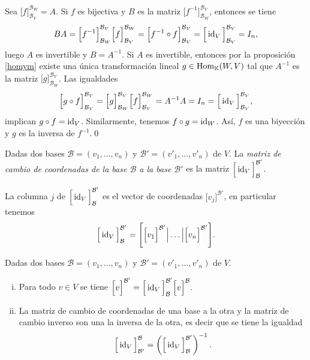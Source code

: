 Sea $\Big[ f \Big]^{\mathcal{B}_W}_{\mathcal{B}_V}=A$. Si $f$ es bijectiva y $B$ es la matriz $\Big[ f^{-1} \Big]_{\mathcal{B}_W}^{\mathcal{B}_V}$, entonces se tiene
$$BA=\Big[ f^{-1} \Big]_{\mathcal{B}_W}^{\mathcal{B}_V}\Big[ f \Big]^{\mathcal{B}_W}_{\mathcal{B}_V}= \Big[ f^{-1}\circ f \Big]^{\mathcal{B}_V}_{\mathcal{B}_V}=\Big[\operatorname{id}_V\Big]^{\mathcal{B}_V}_{\mathcal{B}_V}=I_n,$$
luego $A$ es invertible y $B=A^{-1}$. Si $A$ es invertible, entonces por la proposici\'on \ref{homym} existe una \'unica transformaci\'on lineal $g\in \operatorname{Hom}_{\mathbb{K}}(W,V)$ tal que $A^{-1}$ es la matriz $\Big[ g \Big]^{\mathcal{B}_V}_{\mathcal{B}_W}$. Las igualdades
$$\Big[ g\circ f \Big]^{\mathcal{B}_V}_{\mathcal{B}_V}=\Big[ g \Big]^{\mathcal{B}_V}_{\mathcal{B}_W}\Big[ f \Big]^{\mathcal{B}_W}_{\mathcal{B}_V}=A^{-1}A=I_n=\Big[ \operatorname{id}_V \Big]^{\mathcal{B}_V}_{\mathcal{B}_V},$$
implican $g\circ f=\operatorname{id}_V$. Similarmente, tenemos $f\circ g=\operatorname{id}_W$. As\'i, $f$ es una biyecci\'on y $g$ es la inversa de $f^{-1}$.\qed

\begin{defn}
Dadas dos bases $\mathcal{B}=(v_1,\ldots,v_n)$ y $\mathcal{B}'=(v'_1,\ldots,v'_n)$ de $V$. La \emph{matriz de cambio de coordenadas de la base $\mathcal{B}$ a la base $\mathcal{B}'$} es la matriz $\Big[\operatorname{id}_V\Big]^{\mathcal{B}'}_\mathcal{B}$.
\end{defn}

\begin{obs}
La columna $j$ de $\Big[\operatorname{id}_V\Big]^{\mathcal{B}'}_{\mathcal{B}}$ es el vector de coordenadas $\Big[ v_j\Big]^{\mathcal{B}'}$, en particular tenemos
$$\Big[\operatorname{id}_V\Big]^{\mathcal{B}'}_{\mathcal{B}}=\Bigg[\Big[ v_1\Big]^{\mathcal{B}'}\Big|\ldots \Big| \Big[ v_n\Big]^{\mathcal{B}'}\Bigg].$$
\end{obs}

\begin{prop}
Dadas dos bases $\mathcal{B}=(v_1,\ldots,v_n)$ y $\mathcal{B}'=(v'_1,\ldots,v'_n)$ de $V$.
\begin{enumerate}[(i)]
\item Para todo $v\in V$ se tiene $\Big[v\Big]^{\mathcal{B}'}=\Big[\operatorname{id}_V\Big]^{\mathcal{B}'}_\mathcal{B}\Big[v\Big]^{\mathcal{B}}.$
\item La matriz de cambio de coordenadas de una base a la otra y la matriz de cambio inverso son una la inversa de la otra, es decir que se tiene la igualdad
$$\Big[\operatorname{id}_V\Big]^{\mathcal{B}}_{\mathcal{B}'}=\left(\Big[\operatorname{id}_V\Big]^{\mathcal{B}'}_{\mathcal{B}}\right)^{-1}.$$
\end{enumerate}
\end{prop}

